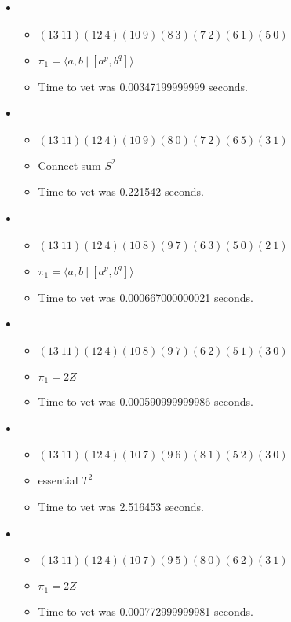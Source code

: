 \documentclass{article}
\begin{document}
\begin{itemize}
\begin{itemize}
\end{itemize}
\item \begin{itemize}
      \item $(13\ 11)(12\ 4)(10\ 9)(8\ 3)(7\ 2)(6\ 1)(5\ 0)$
      \item $\pi_1 = \langle a,b\ |\ [a^p,b^q]\rangle$
      \item Time to vet was 0.00347199999999 seconds.
\end{itemize}
\item \begin{itemize}
      \item $(13\ 11)(12\ 4)(10\ 9)(8\ 0)(7\ 2)(6\ 5)(3\ 1)$
      \item Connect-sum $S^2$
      \item Time to vet was 0.221542 seconds.
\end{itemize}
\item \begin{itemize}
      \item $(13\ 11)(12\ 4)(10\ 8)(9\ 7)(6\ 3)(5\ 0)(2\ 1)$
      \item $\pi_1 = \langle a,b\ |\ [a^p,b^q]\rangle$
      \item Time to vet was 0.000667000000021 seconds.
\end{itemize}
\item \begin{itemize}
      \item $(13\ 11)(12\ 4)(10\ 8)(9\ 7)(6\ 2)(5\ 1)(3\ 0)$
      \item $\pi_1 =2 Z$
      \item Time to vet was 0.000590999999986 seconds.
\end{itemize}
\item \begin{itemize}
      \item $(13\ 11)(12\ 4)(10\ 7)(9\ 6)(8\ 1)(5\ 2)(3\ 0)$
      \item essential $T^2$
      \item Time to vet was 2.516453 seconds.
\end{itemize}
\item \begin{itemize}
      \item $(13\ 11)(12\ 4)(10\ 7)(9\ 5)(8\ 0)(6\ 2)(3\ 1)$
      \item $\pi_1 =2 Z$
      \item Time to vet was 0.000772999999981 seconds.
\end{itemize}

\end{itemize}
\end{document}
